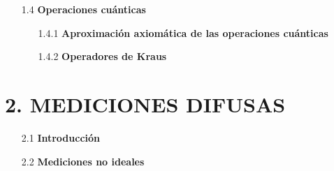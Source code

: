 \documentclass[12pt,oneside]{book}\raggedbottom{} %
\begin{document}
\begin{sloppypar}
{{\begin{itemize}
\begin{itemize}
  
  
  \item[1.3.2]\textbf{Operadores POVM} 
  
\end{itemize}
\item[1.4]\textbf{Operaciones cuánticas}
\begin{itemize}
  \item[1.4.1] \textbf{Aproximación axiomática de las operaciones cuánticas} %
  \item[1.4.2] \textbf{Operadores de Kraus }
  
  
\end{itemize}
\end{itemize}

\section*{2. MEDICIONES DIFUSAS}
  \begin{itemize}
    \item[2.1]\textbf{Introducción}



  \item[2.2]\textbf{Mediciones no ideales}  


\end{itemize}}}
\end{sloppypar}
\end{document}
